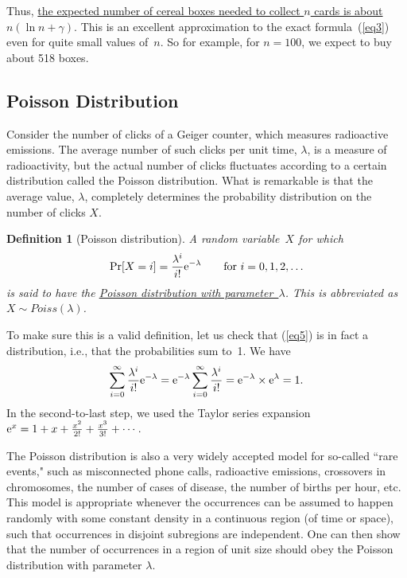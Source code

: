\documentclass[11pt]{article}
\def\ul#1{\underline{#1}}
\newcounter{thm}
\newtheorem{definition}{Definition}[thm]
\begin{document}
Thus, \ul{the expected number of cereal boxes needed to
collect $n$ cards is about $n(\ln n+\gamma)$}.  This is an excellent
approximation to the exact formula~(\ref{eq3}) even for quite small
values of~$n$.  So for example, for $n=100$, we expect to buy about 518 boxes.


\subsection*{Poisson Distribution}

Consider the number of clicks of a Geiger counter, which measures radioactive emissions. 
The average number of such clicks per unit time, $\lambda$, is a measure of radioactivity, but the actual
number of clicks fluctuates according to a certain distribution called the Poisson distribution. 
What is remarkable is that the average value, $\lambda$, completely determines the probability distribution on
the number of clicks $X$. 

\begin{definition}[Poisson distribution] A random variable~$X$ for which
\begin{equation}\label{eq5}
   \Pr[X=i] = {{\lambda^i}\over{i!}}{\rm e}^{-\lambda}\qquad\hbox{\rm for
                            $i=0,1,2,\ldots$}
\end{equation}
is said to have the \ul{Poisson distribution with parameter~$\lambda$}. This is abbreviated as $X \sim Poiss(\lambda)$.
\end{definition}

To make sure this is a valid definition, let us check that (\ref{eq5})
is in fact a distribution, i.e., that the probabilities sum to~1.  We have $$
   \sum_{i=0}^\infty {{\lambda^i}\over{i!}}{\rm e}^{-\lambda} =
   {\rm e}^{-\lambda}\sum_{i=0}^\infty {{\lambda^i}\over{i!}} =
   {\rm e}^{-\lambda}\times{\rm e}^{\lambda} = 1.  $$
In the second-to-last step, we used the Taylor series expansion
${\rm e}^x = 1+x+{{x^2}\over{2!}}+{{x^3}\over{3!}}+\cdots$.

The Poisson distribution is also a very widely accepted model for so-called ``rare events," such as misconnected
phone calls, radioactive emissions, crossovers in chromosomes, the number of cases of disease, the number of births per 
hour, etc. This model is appropriate whenever the occurrences can be assumed to happen randomly with some 
constant density in a continuous region (of time or space), such that occurrences in disjoint subregions are independent. 
One can then show
that the number of occurrences in a region of unit size should obey the Poisson distribution with parameter $\lambda$.
\end{document}
